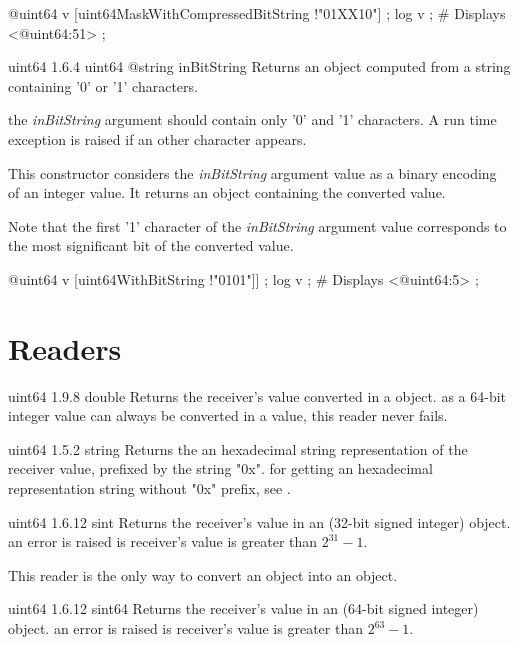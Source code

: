 \exempleDeuxLignes
{}
{@uint64 v [uint64MaskWithCompressedBitString !"01XX10"] ;}
{log v ; \# Displays <@uint64:51> ;}



{uint64}
{1.6.4}
{uint64}
{@string inBitString}
{Returns an  object computed from a string containing '0' or '1' characters.}
{the \emph{inBitString} argument should contain only '0' and '1' characters. A run time exception is raised if an other character appears.

This constructor considers the \emph{inBitString} argument value as a binary encoding of an integer value. It returns an  object containing the converted value.

Note that the first '1' character of the \emph{inBitString} argument value corresponds to the most significant bit of the converted value.}

\exempleDeuxLignes
{}
{@uint64 v [uint64WithBitString !"0101"]] ;}
{log v ; \# Displays <@uint64:5> ;}


\section{Readers}

{uint64}
{1.9.8}
{double}
{Returns the receiver's value converted in a  object.}
{as a 64-bit integer value can always be converted in a  value, this reader never fails.}



{uint64}
{1.5.2}
{string}
{Returns the an hexadecimal string representation of the receiver value, prefixed by the string "0x".}
{for getting an hexadecimal representation string without "0x" prefix, see .}





{uint64}
{1.6.12}
{sint}
{Returns the receiver's value in an  (32-bit signed integer) object.}
{an error is raised is receiver's value is greater than $2^{31}-1$.}

This reader is the only way to convert an  object into an  object.




{uint64}
{1.6.12}
{sint64}
{Returns the receiver's value in an  (64-bit signed integer) object.}
{an error is raised is receiver's value is greater than $2^{63}-1$.}

